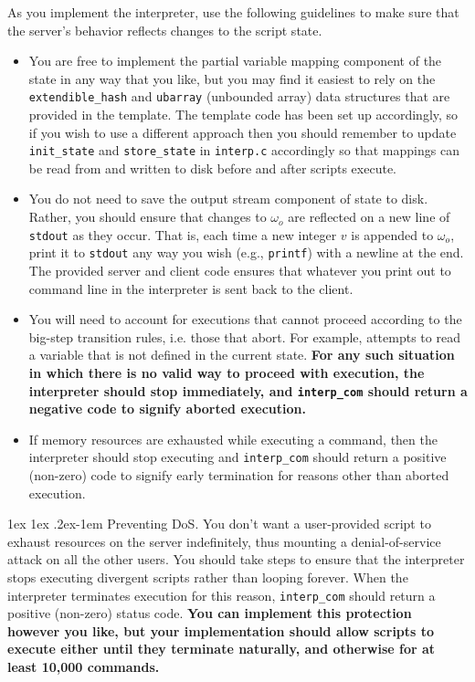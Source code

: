 \documentclass[11pt]{article}
\makeatletter
\renewcommand{\paragraph}{%
  \@startsection{paragraph}{4}%
  {\z@}{1ex \@plus 1ex \@minus .2ex}{-1em}%
  {\normalfont\normalsize\bfseries}
}
\makeatother
\begin{document}
As you implement the interpreter, use the following guidelines to make sure that the server's behavior reflects changes to the script state.
\begin{itemize} 
  \item You are free to implement the partial variable mapping component of the state in any way that you like, but you may find it easiest to rely on the \verb'extendible_hash' and \verb'ubarray' (unbounded array) data structures that are provided in the template. The template code has been set up accordingly, so if you wish to use a different approach then you should remember to update \verb'init_state' and \verb'store_state' in \verb'interp.c' accordingly so that mappings can be read from and written to disk before and after scripts execute.
  \item You do not need to save the output stream component of state to disk. Rather, you should ensure that changes to $\omega_o$ are reflected on a new line of \verb'stdout' as they occur. That is, each time a new integer $v$ is appended to $\omega_o$, print it to \verb'stdout' any way you wish (e.g., \verb'printf') with a newline at the end. The provided server and client code ensures that whatever you print out to command line in the interpreter is sent back to the client.
  \item You will need to account for executions that cannot proceed according to the big-step transition rules, i.e. those that abort. For example, attempts to read a variable that is not defined in the current state. \textbf{For any such situation in which there is no valid way to proceed with execution, the interpreter should stop immediately, and \texttt{interp\_com} should return a negative code to signify aborted execution.}
  \item If memory resources are exhausted while executing a command, then the interpreter should stop executing and \verb'interp_com' should return a positive (non-zero) code to signify early termination for reasons other than aborted execution.
\end{itemize}

\paragraph{Preventing DoS.} You don't want a user-provided script to exhaust resources on the server indefinitely, thus mounting a denial-of-service attack on all the other users. You should take steps to ensure that the interpreter stops executing divergent scripts rather than looping forever. When the interpreter terminates execution for this reason, \verb'interp_com' should return a positive (non-zero) status code. \textbf{You can implement this protection however you like, but your implementation should allow scripts to execute either until they terminate naturally, and otherwise for at least 10,000 commands.}
\end{document}

